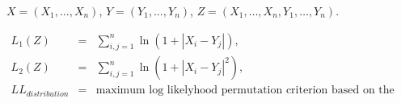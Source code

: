 \documentclass{article}
\begin{document}
$X=(X_1,\ldots,X_n)$, $Y=(Y_1,\ldots,Y_n)$, $Z=(X_1,\ldots,X_n,Y_1,\ldots,Y_n)$.

\begin{eqnarray}
  \label{L1}
  L_1(Z)&=&\sum_{i,j=1}^{n}{\ln(1+|X_{i}-Y_{j}|)},\\
  \label{L2}
  L_2(Z)&=&\sum_{i,j=1}^{n}{\ln(1+|X_{i}-Y_{j}|^2)},\\
  \label{LL}
  LL_{distribution} &=& \text{maximum log likelyhood permutation criterion based on the distribution}
\end{eqnarray}

%   
%   
%   
%   
%   
%   
%   
%   
%   
%   
%   
%   
%   
%   
%   
%   
\end{document}
